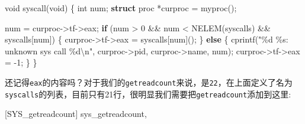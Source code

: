 \documentclass[
]{article}
\newenvironment{Shaded}{}{}
\newcommand{\ControlFlowTok}[1]{\textcolor[rgb]{0.00,0.44,0.13}{\textbf{#1}}}
\newcommand{\DataTypeTok}[1]{\textcolor[rgb]{0.56,0.13,0.00}{#1}}
\newcommand{\DecValTok}[1]{\textcolor[rgb]{0.25,0.63,0.44}{#1}}
\newcommand{\KeywordTok}[1]{\textcolor[rgb]{0.00,0.44,0.13}{\textbf{#1}}}
\newcommand{\NormalTok}[1]{#1}
\newcommand{\OperatorTok}[1]{\textcolor[rgb]{0.40,0.40,0.40}{#1}}
\newcommand{\SpecialCharTok}[1]{\textcolor[rgb]{0.25,0.44,0.63}{#1}}
\newcommand{\StringTok}[1]{\textcolor[rgb]{0.25,0.44,0.63}{#1}}
\begin{document}
\begin{Shaded}
  \begin{Highlighting}[]
    \DataTypeTok{void}\NormalTok{ syscall}\OperatorTok{(}\DataTypeTok{void}\OperatorTok{)}
    \OperatorTok{\{}
    \DataTypeTok{int}\NormalTok{ num}\OperatorTok{;}
    \KeywordTok{struct}\NormalTok{ proc }\OperatorTok{*}\NormalTok{curproc }\OperatorTok{=}\NormalTok{ myproc}\OperatorTok{();}

    \NormalTok{  num }\OperatorTok{=}\NormalTok{ curproc}\OperatorTok{{-}\textgreater{}}\NormalTok{tf}\OperatorTok{{-}\textgreater{}}\NormalTok{eax}\OperatorTok{;}
    \ControlFlowTok{if} \OperatorTok{(}\NormalTok{num }\OperatorTok{\textgreater{}} \DecValTok{0} \OperatorTok{\&\&}\NormalTok{ num }\OperatorTok{\textless{}}\NormalTok{ NELEM}\OperatorTok{(}\NormalTok{syscalls}\OperatorTok{)} \OperatorTok{\&\&}\NormalTok{ syscalls}\OperatorTok{[}\NormalTok{num}\OperatorTok{])}
    \OperatorTok{\{}
    \NormalTok{    curproc}\OperatorTok{{-}\textgreater{}}\NormalTok{tf}\OperatorTok{{-}\textgreater{}}\NormalTok{eax }\OperatorTok{=}\NormalTok{ syscalls}\OperatorTok{[}\NormalTok{num}\OperatorTok{]();}
    \OperatorTok{\}}
    \ControlFlowTok{else}
    \OperatorTok{\{}
    \NormalTok{    cprintf}\OperatorTok{(}\StringTok{"}\SpecialCharTok{\%d}\StringTok{ }\SpecialCharTok{\%s}\StringTok{: unknown sys call }\SpecialCharTok{\%d\textbackslash{}n}\StringTok{"}\OperatorTok{,}
    \NormalTok{            curproc}\OperatorTok{{-}\textgreater{}}\NormalTok{pid}\OperatorTok{,}\NormalTok{ curproc}\OperatorTok{{-}\textgreater{}}\NormalTok{name}\OperatorTok{,}\NormalTok{ num}\OperatorTok{);}
    \NormalTok{    curproc}\OperatorTok{{-}\textgreater{}}\NormalTok{tf}\OperatorTok{{-}\textgreater{}}\NormalTok{eax }\OperatorTok{=} \OperatorTok{{-}}\DecValTok{1}\OperatorTok{;}
    \OperatorTok{\}}
    \OperatorTok{\}}
  \end{Highlighting}
\end{Shaded}

还记得\texttt{eax}的内容吗？对于我们的\texttt{getreadcount}来说，是\texttt{22}，在上面定义了名为\texttt{syscalls}的列表，目前只有21行，很明显我们需要把\texttt{getreadcount}添加到这里:

\begin{Shaded}
  \begin{Highlighting}[]
    \OperatorTok{[}\NormalTok{SYS\_getreadcount}\OperatorTok{]}\NormalTok{ sys\_getreadcount}\OperatorTok{,}
  \end{Highlighting}
\end{Shaded}
\end{document}
